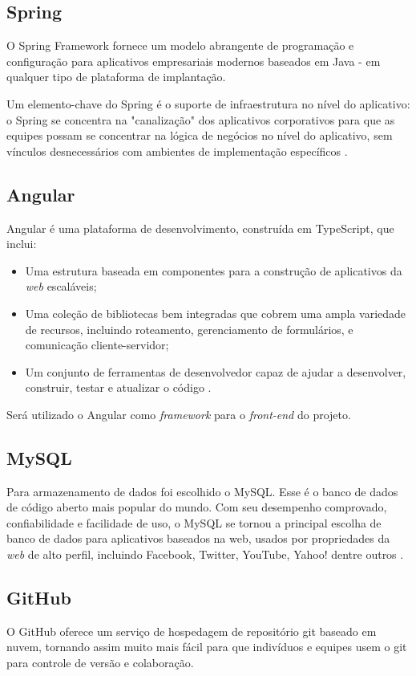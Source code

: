 \subsection{Spring}
O Spring Framework fornece um modelo abrangente de programação e configuração para aplicativos empresariais modernos baseados em Java - em qualquer tipo de plataforma de implantação.


Um elemento-chave do Spring é o suporte de infraestrutura no nível do aplicativo: o Spring se concentra na "canalização" dos aplicativos corporativos para que as equipes possam se concentrar na lógica de negócios no nível do aplicativo, sem vínculos desnecessários com ambientes de implementação específicos \cite{spring:2021}.

\subsection {Angular}
Angular é uma plataforma de desenvolvimento, construída em 
TypeScript, que inclui:
\begin{itemize}
\item Uma estrutura baseada em componentes para a construção de aplicativos da \textit{\gls{web}} escaláveis;
\item Uma coleção de bibliotecas bem integradas que cobrem uma ampla variedade de recursos, incluindo roteamento, gerenciamento de formulários, e comunicação cliente-servidor;
\item Um conjunto de ferramentas de desenvolvedor capaz de ajudar a desenvolver, construir, testar e atualizar o código \cite{angular:2021}.
\end{itemize}

Será utilizado o Angular como \textit{\gls{framework}} para o \textit{\gls{front-end}} do projeto.

\subsection{MySQL}
Para armazenamento de dados foi escolhido o MySQL. Esse é o banco de dados de código aberto mais popular do mundo. Com seu desempenho comprovado, confiabilidade e facilidade de uso, o MySQL se tornou a principal escolha de banco de dados para aplicativos baseados na web, usados por propriedades da \textit{\gls{web}} de alto perfil, incluindo Facebook, Twitter, YouTube, Yahoo! dentre outros \cite{mysql:2021}.

\subsection{GitHub}
O GitHub oferece um serviço de hospedagem de repositório \gls{git} baseado em nuvem, tornando assim muito mais fácil para que indivíduos e equipes usem o \gls{git} para controle de versão e colaboração.


